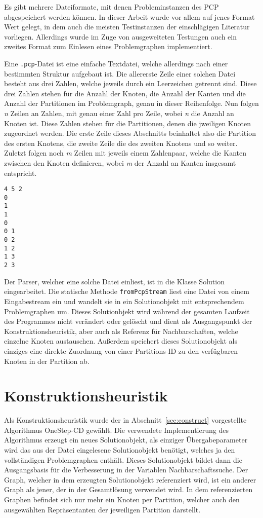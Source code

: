 Es gibt mehrere Dateiformate, mit denen Probleminstanzen des PCP abgespeichert werden können. In dieser Arbeit wurde vor allem auf jenes
Format Wert gelegt, in dem auch die meisten Testinstanzen der einschlägigen Literatur vorliegen. Allerdings wurde im Zuge von aus\-ge\-wei\-te\-ten 
Testungen auch ein zweites Format zum Einlesen eines Problemgraphen implementiert. 

Eine \texttt{.pcp}-Datei ist eine einfache Textdatei, welche allerdings nach einer bestimmten Struktur aufgebaut ist. Die allererste Zeile
einer solchen Datei besteht aus drei Zahlen, welche jeweils durch ein Leerzeichen getrennt sind. Diese drei Zahlen stehen für die Anzahl der Knoten, 
die Anzahl der Kanten und die Anzahl der Partitionen im Problemgraph, genau in dieser Reihenfolge. Nun folgen \textit{n} Zeilen an Zahlen, mit 
genau einer Zahl pro Zeile, wobei \textit{n} die Anzahl an Knoten ist. Diese Zahlen stehen für die Partitionen, denen die jweiligen Knoten zugeordnet werden.
Die erste Zeile dieses Abschnitts beinhaltet also die Partition des ersten Knotens, die zweite Zeile die des zweiten Knotens und so weiter. Zuletzt folgen noch
\textit{m} Zeilen mit jeweils einem Zahlenpaar, welche die Kanten zwischen den Knoten definieren, wobei \textit{m} der Anzahl an Kanten insgesamt
entspricht.

\singlespacing
\begin{lstlisting}[caption={Eine einfache \textit{.pcp}-Beispieldatei},label={lst:pcp}]
4 5 2
0
1
1
0
0 1
0 2
1 2
1 3
2 3
\end{lstlisting}

Der Parser, welcher eine solche Datei einliest, ist in die Klasse Solution eingearbeitet. Die statische Methode \texttt{fromPcpStream} liest eine
Datei von einem Eingabestream ein und wandelt sie in ein Solutionobjekt mit entsprechendem Problemgraphen um. Dieses Solutionbjekt wird während
der gesamten Laufzeit des Programmes nicht verändert oder gelöscht und dient als Ausgangspunkt der Konstruktionsheuristik, aber auch als
Referenz für Nachbarschaften, welche einzelne Knoten austauschen. Außerdem speichert dieses Solutionobjekt als einziges eine direkte Zuordnung von einer Partitions-ID
zu den verfügbaren Knoten in der Partition ab. 

\section{Konstruktionsheuristik}
Als Konstruktionsheuristik wurde der in Abschnitt~\ref{sec:construct} vorgestellte Algorithmus OneStep-CD gewählt. Die verwendete Implementierung des Algorithmus
erzeugt ein neues Solutionobjekt, als einziger Übergabeparameter wird das aus der Datei eingelesene Solutionobjekt benötigt, welches ja den vollständigen Problemgraphen
enthält. Dieses Solutionobjekt bildet dann die Ausgangsbasis für die Verbesserung in der Variablen Nachbarschaftssuche. Der Graph, welcher in dem erzeugten Solutionobjekt
referenziert wird, ist ein anderer Graph als jener, der in der Gesamtlösung verwendet wird. In dem referenzierten Graphen befindet sich nur mehr ein Knoten per Partition, welcher auch den ausgewählten Repräsentanten der jeweiligen Partition darstellt.

